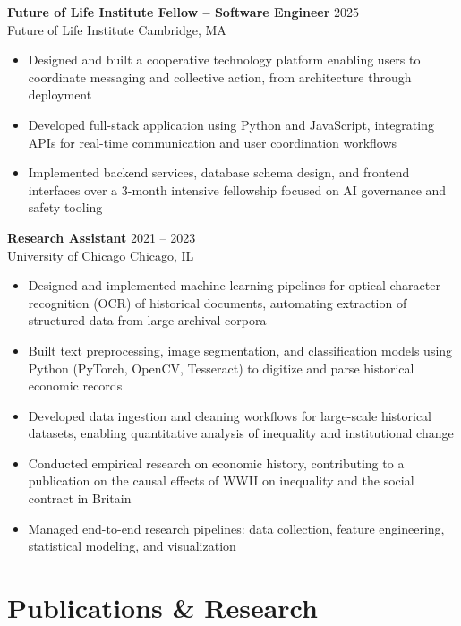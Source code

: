 \documentclass[11pt,letterpaper]{article}
\begin{document}
\textbf{Future of Life Institute Fellow -- Software Engineer} \hfill 2025 \\
Future of Life Institute \hfill Cambridge, MA
\begin{itemize}
    \item Designed and built a cooperative technology platform enabling users to coordinate messaging and collective action, from architecture through deployment
    \item Developed full-stack application using Python and JavaScript, integrating APIs for real-time communication and user coordination workflows
    \item Implemented backend services, database schema design, and frontend interfaces over a 3-month intensive fellowship focused on AI governance and safety tooling
\end{itemize}

\vspace{4pt}

\textbf{Research Assistant} \hfill 2021 -- 2023 \\
University of Chicago \hfill Chicago, IL
\begin{itemize}
    \item Designed and implemented machine learning pipelines for optical character recognition (OCR) of historical documents, automating extraction of structured data from large archival corpora
    \item Built text preprocessing, image segmentation, and classification models using Python (PyTorch, OpenCV, Tesseract) to digitize and parse historical economic records
    \item Developed data ingestion and cleaning workflows for large-scale historical datasets, enabling quantitative analysis of inequality and institutional change
    \item Conducted empirical research on economic history, contributing to a publication on the causal effects of WWII on inequality and the social contract in Britain
    \item Managed end-to-end research pipelines: data collection, feature engineering, statistical modeling, and visualization
\end{itemize}

\section{Publications \& Research}
\end{document}
